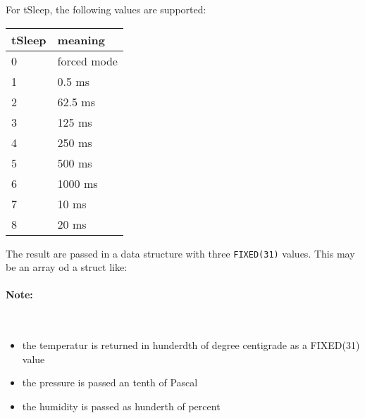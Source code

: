 For tSleep, the following values are supported:

\begin{tabular}{|l|l|}
\hline
tSleep & meaning \\
\hline
0 & forced mode \\
1 & 0.5 ms \\
2 & 62.5 ms \\
3 & 125 ms \\
4 & 250 ms \\
5 & 500 ms \\
6 & 1000 ms \\
7 & 10 ms \\
8 & 20 ms \\
\hline
\end{tabular}

The result are passed in a data structure with three \texttt{FIXED(31)} values.
This may be an array od a struct like:
\paragraph{Note:}\ 
\begin{itemize}
\item the temperatur is returned in hunderdth of degree centigrade as a 
    FIXED(31) value
\item the pressure is passed an tenth of Pascal 
\item the humidity is passed as hunderth of percent
\end{itemize}

